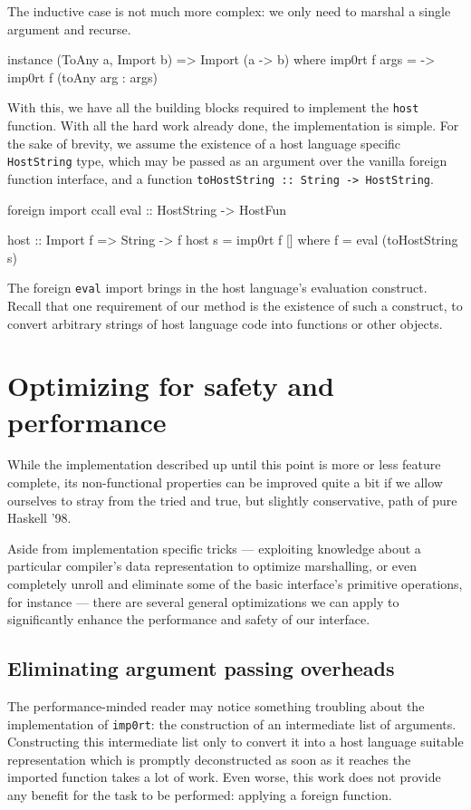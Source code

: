 \documentclass{sigplanconf}
\begin{document}
The inductive case is not much more complex: we only need to marshal a single
argument and recurse.

\begin{code}
  instance (ToAny a, Import b) =>
           Import (a -> b) where
    imp0rt f args =
      \arg -> imp0rt f (toAny arg : args)
\end{code}

With this, we have all the building blocks required to implement the
\lstinline!host! function. With all the hard work already done, the
implementation is simple. For the sake of brevity, we assume the
existence of a host language specific \lstinline!HostString! type, which may
be passed as an argument over the vanilla foreign function interface, and a
function \lstinline!toHostString :: String -> HostString!.

\begin{code}
  foreign import ccall
    eval :: HostString -> HostFun

  host :: Import f => String -> f
  host s = imp0rt f []
    where
      f = eval (toHostString s)
\end{code}

The foreign \lstinline!eval! import brings in the host language's evaluation
construct. Recall that one requirement of our method is the existence of such
a construct, to convert arbitrary strings of host language code into functions
or other objects.

\section{Optimizing for safety and performance}
\label{sec:optimizations}
While the implementation described up until this point is more or less
feature complete, its non-functional properties can be improved quite a bit
if we allow ourselves to stray from the tried and true, but slightly
conservative, path of pure Haskell '98.

Aside from implementation specific tricks --- exploiting knowledge about a
particular compiler's data representation to optimize marshalling, or even
completely unroll and eliminate some of the basic interface's primitive
operations, for instance --- there are several general optimizations we can
apply to significantly enhance the performance and safety of our interface.

\subsection{Eliminating argument passing overheads}
\label{sec:specialization}
The performance-minded reader may notice something troubling about the
implementation of \lstinline!imp0rt!: the construction of an intermediate list
of arguments. Constructing this intermediate list only to convert it into a
host language suitable representation which is promptly deconstructed as soon
as it reaches the imported function takes a lot of work. Even worse, this work
does not provide any benefit for the task to be performed: applying a foreign
function.
\end{document}
